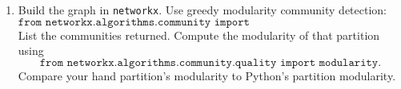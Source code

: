 \documentclass[10pt]{article}
\begin{document}
\begin{enumerate}[{$1.]
\begin{enumerate}[{$a.)$}]
\vfill\vfill

\item Build the graph in \texttt{networkx}. Use greedy modularity community detection:
\[
\texttt{from networkx.algorithms.community import greedy\_modularity\_communities}
\]
List the communities returned. Compute the modularity of that partition using
\[
\texttt{from networkx.algorithms.community.quality import modularity}.
\]
Compare your hand partition's modularity to Python's partition modularity.


\end{enumerate}

\pagebreak



\end{enumerate}
\end{document}
